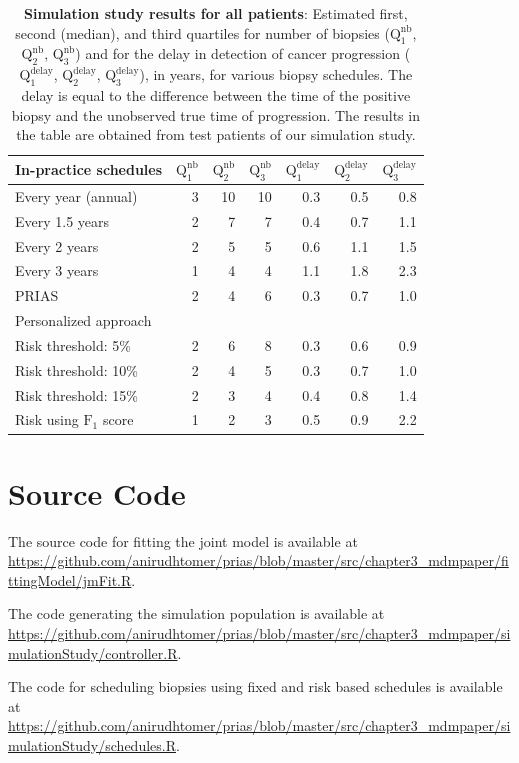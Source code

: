 \begin{subappendices}
\begin{table}
\small
\centering
\caption{\textbf{Simulation study results for all patients}: Estimated first, second (median), and third quartiles for number of biopsies ($\mbox{Q}^{\mbox{nb}}_1$, $\mbox{Q}^{\mbox{nb}}_2$, $\mbox{Q}^{\mbox{nb}}_3$) and for the delay in detection of cancer progression ($\mbox{Q}^{\mbox{delay}}_1$, $\mbox{Q}^{\mbox{delay}}_2$, $\mbox{Q}^{\mbox{delay}}_3$), in years, for various biopsy schedules. The delay is equal to the difference between the time of the positive biopsy and the unobserved true time of progression. The results in the table are obtained from test patients of our simulation study.}
\label{c3:table:app3}
\begin{tabular}{l|rrr|rrr}
\toprule
In-practice schedules & $\mbox{Q}^{\mbox{nb}}_1$ & $\mbox{Q}^{\mbox{nb}}_2$ & $\mbox{Q}^{\mbox{nb}}_3$ & $\mbox{Q}^{\mbox{delay}}_1$  & $\mbox{Q}^{\mbox{delay}}_2$  & $\mbox{Q}^{\mbox{delay}}_3$ \\
\midrule
Every year (annual)         & 3  & 10 & 10 & 0.3 & 0.5 & 0.8 \\
Every 1.5 years      & 2  & 7  & 7  & 0.4 & 0.7 & 1.1 \\
Every 2 years       & 2  & 5  & 5  & 0.6 & 1.1 & 1.5 \\
Every 3 years      & 1  & 4  & 4  & 1.1 & 1.8 & 2.3 \\
PRIAS          & 2  & 4  & 6  & 0.3 & 0.7 & 1.0  \\
\midrule
\multicolumn{7}{l}{Personalized approach}\\
\midrule
Risk threshold: 5\%     & 2  & 6  & 8  & 0.3 & 0.6 & 0.9 \\
Risk threshold: 10\%    & 2  & 4  & 5  & 0.3 & 0.7 & 1.0   \\
Risk threshold: 15\%    & 2  & 3  & 4  & 0.4 & 0.8 & 1.4 \\
Risk using $\mbox{F}_1$ score & 1  & 2  & 3  & 0.5 & 0.9 & 2.2 \\
\bottomrule
\end{tabular}
\end{table}


\section{Source Code}
The source code for fitting the joint model is available at \url{https://github.com/anirudhtomer/prias/blob/master/src/chapter3_mdmpaper/fittingModel/jmFit.R}. 

The code generating the simulation population is available at \url{https://github.com/anirudhtomer/prias/blob/master/src/chapter3_mdmpaper/simulationStudy/controller.R}. 

The code for scheduling biopsies using fixed and risk based schedules is available at \url{https://github.com/anirudhtomer/prias/blob/master/src/chapter3_mdmpaper/simulationStudy/schedules.R}.

\end{subappendices}
